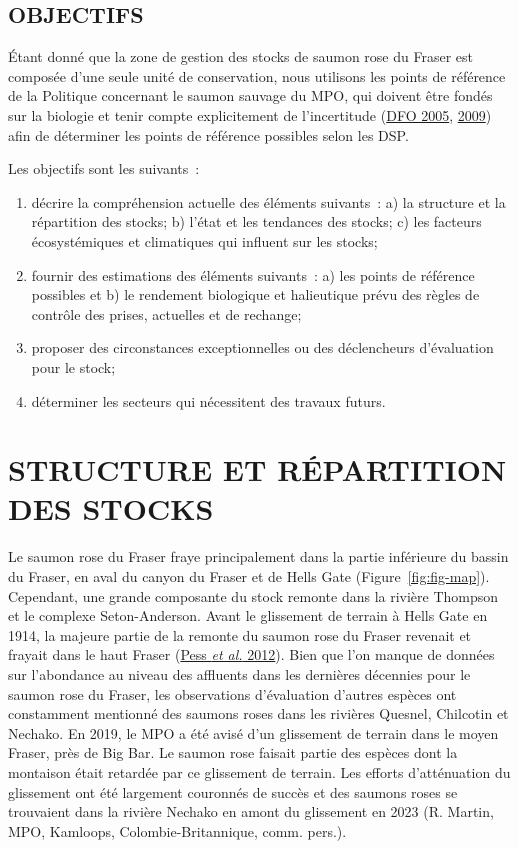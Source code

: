 \documentclass[french,11pt]{book}
\begin{document}
\hypertarget{objectifs}{%
\subsection{OBJECTIFS}\label{objectifs}}

Étant donné que la zone de gestion des stocks de saumon rose du Fraser est composée d'une seule unité de conservation, nous utilisons les points de référence de la Politique concernant le saumon sauvage du MPO, qui doivent être fondés sur la biologie et tenir compte explicitement de l'incertitude (\protect\hyperlink{ref-dfoCanadaPolicyConservation2005}{DFO 2005}, \protect\hyperlink{ref-dfoFisheryDecisionmakingFramework2009}{2009}) afin de déterminer les points de référence possibles selon les DSP.

Les objectifs sont les suivants~:
\begin{enumerate}
\def\labelenumi{\arabic{enumi}.}
\item
  décrire la compréhension actuelle des éléments suivants~: a) la structure et la répartition des stocks; b) l'état et les tendances des stocks; c) les facteurs écosystémiques et climatiques qui influent sur les stocks;
\item
  fournir des estimations des éléments suivants~: a) les points de référence possibles et b) le rendement biologique et halieutique prévu des règles de contrôle des prises, actuelles et de rechange;
\item
  proposer des circonstances exceptionnelles ou des déclencheurs d'évaluation pour le stock;
\item
  déterminer les secteurs qui nécessitent des travaux futurs.
\end{enumerate}
\hypertarget{structure-et-ruxe9partition-des-stocks}{%
\section{STRUCTURE ET RÉPARTITION DES STOCKS}\label{structure-et-ruxe9partition-des-stocks}}

Le saumon rose du Fraser fraye principalement dans la partie inférieure du bassin du Fraser, en aval du canyon du Fraser et de Hells Gate (Figure~\ref{fig:fig-map}). Cependant, une grande composante du stock remonte dans la rivière Thompson et le complexe Seton-Anderson. Avant le glissement de terrain à Hells Gate en 1914, la majeure partie de la remonte du saumon rose du Fraser revenait et frayait dans le haut Fraser (\protect\hyperlink{ref-pessInfluencePopulationDynamics2012}{Pess \emph{et al.} 2012}). Bien que l'on manque de données sur l'abondance au niveau des affluents dans les dernières décennies pour le saumon rose du Fraser, les observations d'évaluation d'autres espèces ont constamment mentionné des saumons roses dans les rivières Quesnel, Chilcotin et Nechako. En 2019, le MPO a été avisé d'un glissement de terrain dans le moyen Fraser, près de Big Bar. Le saumon rose faisait partie des espèces dont la montaison était retardée par ce glissement de terrain. Les efforts d'atténuation du glissement ont été largement couronnés de succès et des saumons roses se trouvaient dans la rivière Nechako en amont du glissement en 2023 (R. Martin, MPO, Kamloops, Colombie-Britannique, comm. pers.).
\end{document}
